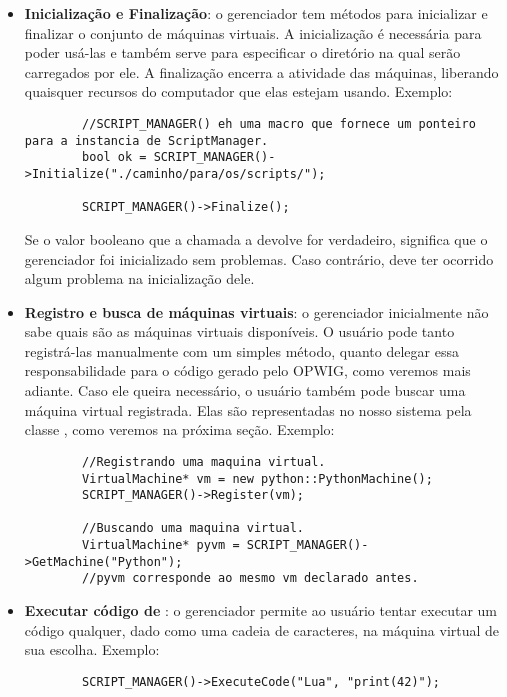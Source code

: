   \begin{itemize}

    \item \textbf{Inicialização e Finalização}: o gerenciador tem métodos para inicializar e finalizar o conjunto
      de máquinas virtuais. A inicialização é necessária para poder usá-las e também serve para
      especificar o diretório na qual  serão carregados por ele. A finalização 
      encerra a atividade das máquinas, liberando quaisquer recursos do computador que elas
      estejam usando. Exemplo:
      \begin{lstlisting}
        //SCRIPT_MANAGER() eh uma macro que fornece um ponteiro para a instancia de ScriptManager.
        bool ok = SCRIPT_MANAGER()->Initialize("./caminho/para/os/scripts/");
        
        SCRIPT_MANAGER()->Finalize();
      \end{lstlisting}
      Se o valor booleano que a chamada a  devolve for verdadeiro, significa que o gerenciador
      foi inicializado sem problemas. Caso contrário, deve ter ocorrido algum problema na inicialização dele.

    \item \textbf{Registro e busca de máquinas virtuais}: o gerenciador inicialmente não sabe
      quais são as máquinas virtuais disponíveis. O usuário pode tanto registrá-las manualmente com
      um simples método, quanto delegar essa responsabilidade para o código gerado pelo OPWIG, como
      veremos mais adiante. Caso ele queira necessário, o usuário também pode buscar uma máquina
      virtual registrada. Elas são representadas no nosso sistema pela classe \VMac{},
      como veremos na próxima seção. Exemplo:
      \begin{lstlisting}
        //Registrando uma maquina virtual.
        VirtualMachine* vm = new python::PythonMachine();
        SCRIPT_MANAGER()->Register(vm);
        
        //Buscando uma maquina virtual.
        VirtualMachine* pyvm = SCRIPT_MANAGER()->GetMachine("Python");
        //pyvm corresponde ao mesmo vm declarado antes.
      \end{lstlisting}

    \item \textbf{Executar código de \script{}}: o gerenciador permite ao usuário tentar executar um código
      qualquer, dado como uma cadeia de caracteres, na máquina virtual de sua escolha. Exemplo:
      \begin{lstlisting}
        SCRIPT_MANAGER()->ExecuteCode("Lua", "print(42)");
      \end{lstlisting}


\end{itemize}
